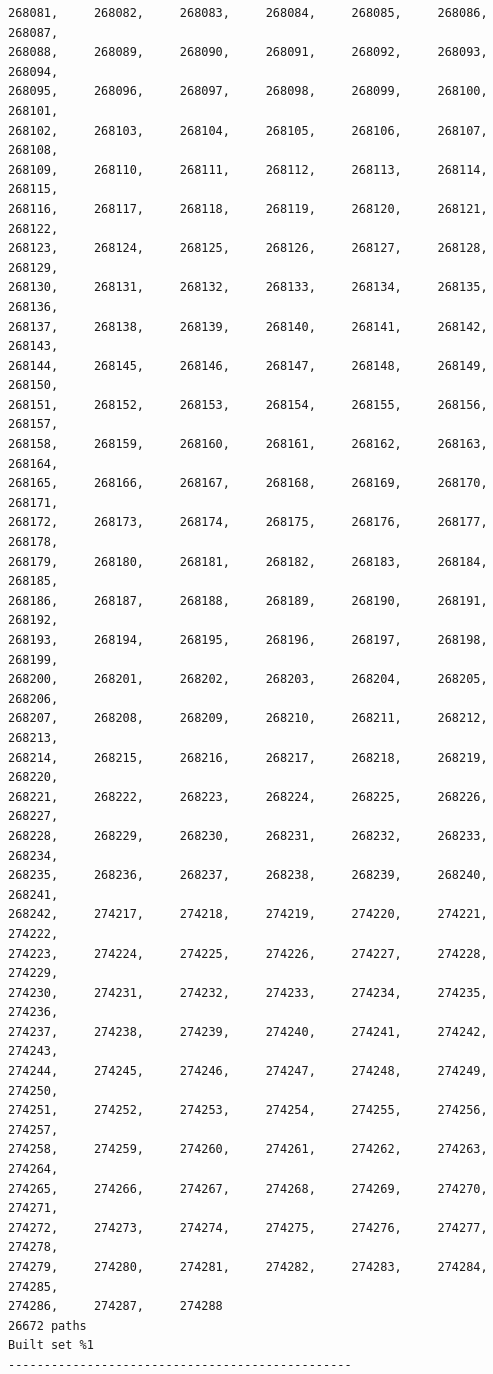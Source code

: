 \documentclass[a4paper,11pt]{report}
\begin{document}
\begin{verbatim}
268081,     268082,     268083,     268084,     268085,     268086,     268087,
268088,     268089,     268090,     268091,     268092,     268093,     268094,
268095,     268096,     268097,     268098,     268099,     268100,     268101,
268102,     268103,     268104,     268105,     268106,     268107,     268108,
268109,     268110,     268111,     268112,     268113,     268114,     268115,
268116,     268117,     268118,     268119,     268120,     268121,     268122,
268123,     268124,     268125,     268126,     268127,     268128,     268129,
268130,     268131,     268132,     268133,     268134,     268135,     268136,
268137,     268138,     268139,     268140,     268141,     268142,     268143,
268144,     268145,     268146,     268147,     268148,     268149,     268150,
268151,     268152,     268153,     268154,     268155,     268156,     268157,
268158,     268159,     268160,     268161,     268162,     268163,     268164,
268165,     268166,     268167,     268168,     268169,     268170,     268171,
268172,     268173,     268174,     268175,     268176,     268177,     268178,
268179,     268180,     268181,     268182,     268183,     268184,     268185,
268186,     268187,     268188,     268189,     268190,     268191,     268192,
268193,     268194,     268195,     268196,     268197,     268198,     268199,
268200,     268201,     268202,     268203,     268204,     268205,     268206,
268207,     268208,     268209,     268210,     268211,     268212,     268213,
268214,     268215,     268216,     268217,     268218,     268219,     268220,
268221,     268222,     268223,     268224,     268225,     268226,     268227,
268228,     268229,     268230,     268231,     268232,     268233,     268234,
268235,     268236,     268237,     268238,     268239,     268240,     268241,
268242,     274217,     274218,     274219,     274220,     274221,     274222,
274223,     274224,     274225,     274226,     274227,     274228,     274229,
274230,     274231,     274232,     274233,     274234,     274235,     274236,
274237,     274238,     274239,     274240,     274241,     274242,     274243,
274244,     274245,     274246,     274247,     274248,     274249,     274250,
274251,     274252,     274253,     274254,     274255,     274256,     274257,
274258,     274259,     274260,     274261,     274262,     274263,     274264,
274265,     274266,     274267,     274268,     274269,     274270,     274271,
274272,     274273,     274274,     274275,     274276,     274277,     274278,
274279,     274280,     274281,     274282,     274283,     274284,     274285,
274286,     274287,     274288
26672 paths
Built set %1
------------------------------------------------


\end{verbatim}
\end{document}
